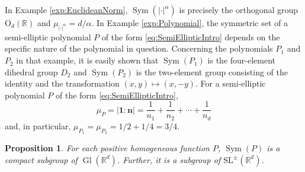\documentclass[11pt, letter]{book}
\newtheorem{proposition}[theorem]{Proposition}
\newenvironment{example}
  {\pushQED{\qed}\renewcommand{\qedsymbol}{$\triangle$}\examplex}
  {\popQED\endexamplex}
\newcommand\Gl{\operatorname{Gl}} %
\newcommand\OdR{\mbox{O}_d(\mathbb{R})} %
\newcommand\Sym{\operatorname{Sym}}
\begin{document}
\begin{example}\normalfont
In Example \ref{exp:EuclideanNorm}, $\Sym(|\cdot|^\alpha)$ is precisely the orthogonal group $\OdR$ and $\mu_{|\cdot|^\alpha}=d/\alpha$. In Example \ref{exp:Polynomial}, the symmetric set of a semi-elliptic polynomial $P$ of the form \eqref{eq:SemiEllipticIntro} depends on the specific nature of the polynomial in question. Concerning the polynomials $P_1$ and $P_2$ in that example, it is easily shown that $\Sym(P_1)$ is the four-element dihedral group $D_2$ and $\Sym(P_2)$ is the two-element group consisting of the identity and the transformation $(x,y)\mapsto (x,-y)$. For a semi-elliptic polynomial $P$ of the form \eqref{eq:SemiEllipticIntro}, 
\begin{equation*}
    \mu_P=|\mathbf{1}:\mathbf{n}|=\frac{1}{n_1}+\frac{1}{n_2}+\cdots+\frac{1}{n_d}
\end{equation*}
and, in particular, $\mu_{P_1}=\mu_{P_2}=1/2+1/4=3/4.$
\end{example}



\begin{framed}
\begin{proposition}\label{prop:SymCompact}
For each positive homogeneous function $P$, $\Sym(P)$ is a compact subgroup of $\Gl(\mathbb{R}^d)$. Further, it is a subgroup of $\text{SL}^{\pm}(\mathbb{R}^d)$.
\end{proposition}
\end{framed}
\end{document}
